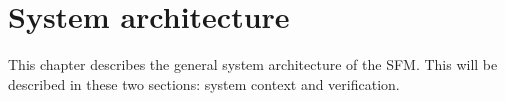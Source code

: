 \chapter{System architecture}
\label{ch:system}
This chapter describes the general system architecture of the SFM. This will be described in these two sections: system context and verification.





